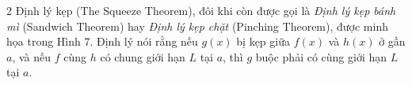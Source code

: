 \begin{paracol}{2}
Định lý kẹp (The Squeeze Theorem), đôi khi còn được gọi là \textit{Định lý kẹp bánh mì} (Sandwich Theorem) hay \textit{Định lý kẹp chặt} (Pinching Theorem), được minh họa trong Hình 7. Định lý nói rằng nếu $g(x)$ bị kẹp giữa $f(x)$ và $h(x)$ ở gần $a$, và nếu $f$ cùng $h$ có chung giới hạn $L$ tại $a$, thì $g$ buộc phải có cùng giới hạn $L$ tại $a$.

\end{paracol}
